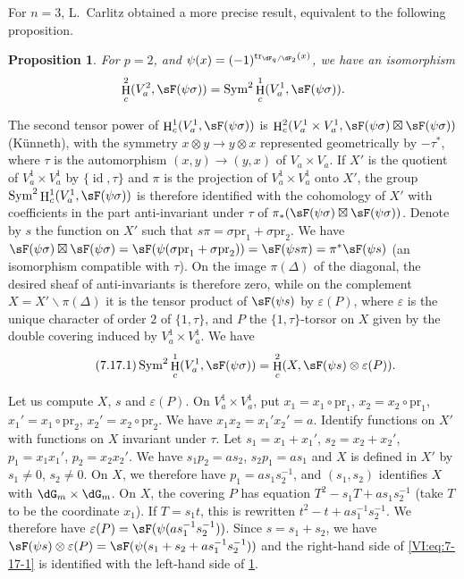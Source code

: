 \documentclass[oneside]{book}
\DeclareMathOperator{\h}{H}
\DeclareMathOperator{\tr}{tr}
\newcounter{char}
\renewcommand{\setminus}{\smallsetminus}
\newcommand{\pr}{\mathrm{pr}} %
\theoremstyle{sga-source}
\theoremstyle{sga-source-dash}
\theoremstyle{sga-source-dotdash}
\theoremstyle{sga-source-number-note-dash}
\theoremstyle{sga-source-note-number-dotdash}
\theoremstyle{sga-source-example-dotdash}
\theoremstyle{sga-source-inline-number}
\theoremstyle{sga-source-bare-number}
\theoremstyle{sga-source}
\newtheorem{proposition_}[subsection]{Proposition}
\newcommand{\PrintPage}[1]{}\newcommand{\MathPage}[1]{}\newcommand{\PrintCite}[2]{#1}\newcommand{\var}[3]{#1}
\begin{document}
For $n=3$, L.\ Carlitz \cite{ca69-2} obtained a more precise result, 
equivalent to the following proposition. 





\begin{proposition_}\label{VI:7-17}
For $p=2$, and $\psi(x)=(-1)^{\tr_{\dF_q/\dF_2}(x)}$, we have an isomorphism 
\[
  \h_c^2(V_a^2,\sF(\psi\sigma)) = \operatorname{Sym}^2 \h_c^1(V_a^1,\sF(\psi\sigma)) \text{.} 
\]
\end{proposition_}

\PrintPage{227}
The second tensor power of $\h_c^1(V_a^1,\sF(\psi\sigma))$ is 
$\h_c^2(V_a^1\times V_a^1,\sF(\psi\sigma)\boxtimes \sF(\psi\sigma))$ 
(K\"unneth), with the symmetry $x\otimes y\to y\otimes x$ represented 
geometrically by $-\tau^\ast$, where $\tau$ is the automorphism 
$(x,y)\to (y,x)$ of $V_a\times V_a$. If $X'$ is the quotient of 
$V_a^1\times V_a^1$ by $\{\operatorname{id}{},\tau\}$ and $\pi$ is the 
projection of $V_a^1\times V_a^1$ onto $X'$, the group 
$\operatorname{Sym}^2 \h_c^1(V_a^1,\sF(\psi\sigma))$ is therefore identified with the 
cohomology of $X'$ with coefficients in the part anti-invariant under $\tau$ of 
$\pi_\ast(\sF(\psi\sigma)\boxtimes \sF(\psi\sigma))$. Denote by $s$ the function 
on $X'$ such that $s\pi =\sigma\pr_1+\sigma\pr_2$. We have 
$\sF(\psi\sigma)\boxtimes \sF(\psi\sigma) = \sF(\psi(\sigma\pr_1+\sigma\pr_2)) = \sF(\psi s \pi) = \pi^\ast \sF(\psi s)$ 
(an isomorphism compatible with $\tau$). On the image $\pi(\Delta)$ of the 
diagonal, the desired sheaf of anti-invariants is therefore zero, while on 
the complement $X=X'\setminus \pi(\Delta)$ it is the tensor product of 
$\sF(\psi s)$ by $\varepsilon(P)$, where $\varepsilon$ is the unique character 
of order $2$ of $\{1,\tau\}$, and $P$ the $\{1,\tau\}$-torsor on $X$ given by the 
double covering induced by $V_a^1\times V_a^1$. We have 
\begin{equation*}\tag{7.17.1}\label{VI:eq:7-17-1}
  \operatorname{Sym}^2 \h_c^1(V_a^1,\sF(\psi\sigma)) = \h_c^2(X,\sF(\psi s)\otimes \varepsilon(P)) \text{.}
\end{equation*}

Let us compute $X$, $s$ and $\varepsilon(P)$. On $V_a^1\times V_a^1$, put 
$x_1=x_1\circ\pr_1$, $x_2=x_2\circ\pr_1$, $x_1'=x_1\circ \pr_2$, 
$x_2'=x_2\circ \pr_2$. We have $x_1 x_2=x_1'x_2'=a$. Identify functions on 
$X'$ with \var{functions on $X$ invariant under $\tau$}{functions on $V_a^1\times V_a^1$ invariant under $\tau$}{S45-SOL-0959}. Let $s_1=x_1+x_1'$, 
$s_2=x_2+x_2'$, $p_1=x_1 x_1'$, $p_2=x_2 x_2'$. We have $s_1 p_2 = a s_2$, 
$s_2 p_1 = a s_1$ and $X$ is defined in $X'$ by $s_1\ne 0$, $s_2\ne 0$. On 
$X$, we therefore have $p_1 = a s_1 s_2^{-1}$, and $(s_1,s_2)$ identifies $X$ with 
$\dG_m\times \dG_m$. On $X$, the covering $P$ has equation 
$T^2-s_1 T+a s_1 s_2^{-1}$ (take $T$ to be the coordinate $x_1$). If 
$T=s_1 t$, this is rewritten $t^2-t+a s_1^{-1} s_2^{-1}$. We therefore have 
$\varepsilon(P) = \sF(\psi(a s_1^{-1} s_2^{-1}))$. Since $s=s_1+s_2$, we have 
$\sF(\psi s)\otimes \varepsilon(P) = \sF(\psi(s_1+s_2+ a s_1^{-1} s_2^{-1}))$ 
and the right-hand side of \eqref{VI:eq:7-17-1} is identified with the left-hand side of 
\ref{VI:7-17}. 
\end{document}
